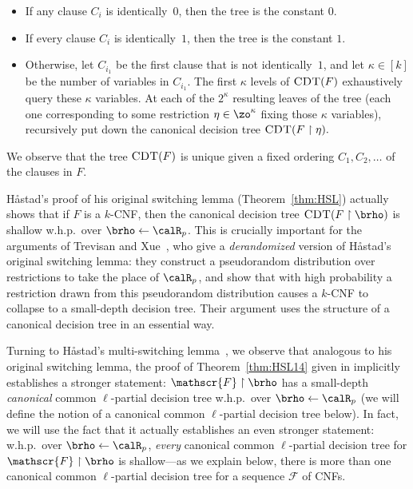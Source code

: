 \documentclass{toc}
\theoremstyle{plain}
\newcommand{\uhr}{\upharpoonright}
\newcommand{\CDT}{\textsc{CDT}}
\begin{document}
\begin{itemize}

\item If any clause $C_i$ is 
%
identically~$0$,  %
then the tree is the constant $0$.  %

\item If every clause $C_i$ is 
%
identically~$1$,  %
then the tree is the constant $1$.   %

\item Otherwise, let $C_{i_1}$ be the first clause that is not identically~$1$, and let $\kappa \in [k]$ be the number of variables in $C_{i_1}$. The first $\kappa$ levels of $\CDT(F)$ exhaustively query these $\kappa$ variables.  At each of the $2^{\kappa}$ resulting leaves of the tree (each one corresponding to some restriction ${\eta} \in \zo^{\kappa}$ fixing those $\kappa$ variables), recursively put down the canonical decision tree $\CDT(F \uhr {\eta}).$

\end{itemize}
We observe that the tree $\CDT(F)$ is unique given a fixed ordering $C_1,C_2,\ldots$ of the clauses in $F$. 


H{\aa}stad's proof of his original switching lemma (Theorem~\ref{thm:HSL}) actually shows that if $F$ is a $k$-CNF, then the canonical decision tree $\CDT(F \uhr \brho)$ is shallow w.h.p.~over $\brho \leftarrow \calR_p$.  This is crucially important for the arguments of Trevisan and Xue~\cite{TX13}, who give a \emph{derandomized} version of H{\aa}stad's original switching lemma:  they construct a pseudorandom distribution over restrictions to take the place of $\calR_p$, and show that with high probability a restriction drawn from this pseudorandom distribution causes a $k$-CNF to collapse to a small-depth decision tree.  Their argument uses the structure of a canonical decision tree in an essential way.

Turning to H{\aa}stad's multi-switching lemma~\cite{Has14}, we observe that analogous to his original switching lemma, the proof of Theorem~\ref{thm:HSL14} given in \cite{Has14} implicitly establishes a stronger statement: $\mathscr{F}\uhr\brho$ has a small-depth \emph{canonical} common $\ell$-partial decision tree w.h.p.~over $\brho\leftarrow\calR_p$ (we will define the notion of a canonical common $\ell$-partial decision tree below).  In fact, we will use the fact that it actually establishes an even stronger statement: w.h.p.~over $\brho\leftarrow\calR_p$,  \emph{every} canonical common $\ell$-partial decision tree for $\mathscr{F}\uhr\brho$ is shallow---as we explain below, there is more than one canonical common $\ell$-partial decision tree for a {sequence} $\mathscr{F}$ of CNFs.
 
\end{document}
